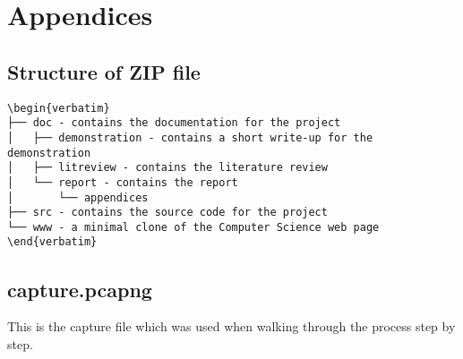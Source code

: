 \section{Appendices}
\subsection{Structure of ZIP file}


\begin{lstlisting}[language=none,style=tree,firstline=2,lastline=8]
\begin{verbatim}
├── doc - contains the documentation for the project
│   ├── demonstration - contains a short write-up for the demonstration
│   ├── litreview - contains the literature review
│   └── report - contains the report
│       └── appendices
├── src - contains the source code for the project
└── www - a minimal clone of the Computer Science web page
\end{verbatim}
\end{lstlisting}

\subsection{capture.pcapng}
This is the capture file which was used when walking through the process step by step.

\newpage
